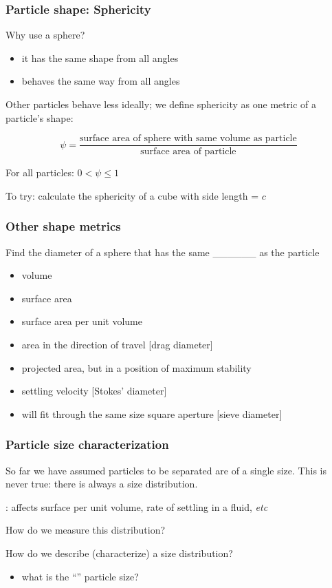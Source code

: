 \begin{frame}\frametitle{Particle shape: Sphericity}
	Why use a sphere?
	\begin{itemize}
		\item	it has the same shape from all angles
		\item	behaves the same way from all angles
	\end{itemize}
	
	Other particles behave less ideally; we define sphericity as one metric of a particle's shape:
	
	
	\[
		\psi = \frac{\text{surface area of sphere with same volume as particle}}{\text{surface area of particle}}
	\]
	
	\vspace{12pt}
	For all particles: \( 0 < \psi \leq 1 \)
	
	\vspace{12pt}
	To try: calculate the sphericity of a cube with side length = $c$ \\ {\scriptsize {\color{myGreen}{Answer: $\psi = 0.806$}}}	
\end{frame}

\begin{frame}\frametitle{Other shape metrics}
	Find the diameter of a sphere that has the same \_\_\_\_\_\_ as the particle
	\begin{itemize}
		\item	volume
		\item	surface area
		\item	surface area per unit volume
		\item	area in the direction of travel [drag diameter]
		\item	projected area, but in a position of maximum stability
		\item	settling velocity [Stokes' diameter]
		\item	will fit through the same size square aperture  [sieve diameter]
	\end{itemize}
\end{frame}

\begin{frame}\frametitle{Particle size characterization}
	So far we have assumed particles to be separated are of a single size. This is never true: there is always a size distribution.
	
	\vspace{12pt}
	{\color{myGreen}{Particle size}}: affects surface per unit volume, rate of settling in a fluid, \emph{etc}
	
	\vspace{12pt}	
	\begin{exampleblock}{{\color{myRed}{Aims}}}
		\vspace{12pt}
		How do we measure this distribution?
		
		\vspace{12pt}
		How do we describe (characterize) a size distribution? 
	\end{exampleblock}
	\begin{itemize}
		\item	what is the ``\textbf{{\color{Brown}{average}}}'' particle size?
	\end{itemize}
\end{frame}

